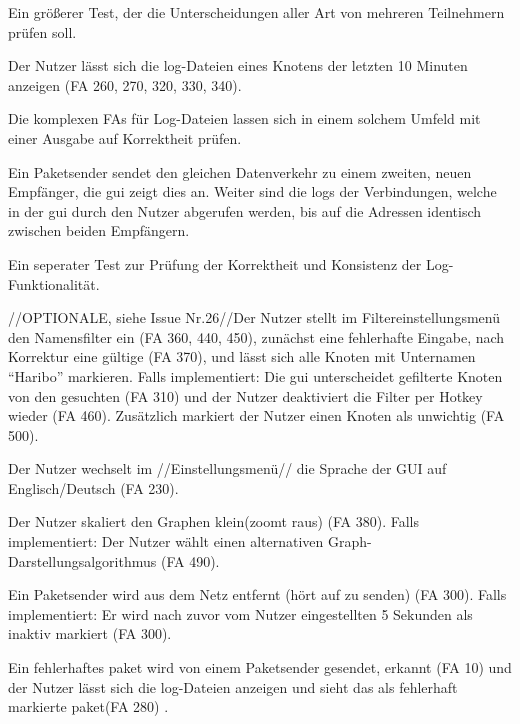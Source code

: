 \begin{description}[style=multiline, leftmargin=4cm, labelwidth=4cm]
  \item[Beschreibung] Ein größerer Test, der die Unterscheidungen aller Art von mehreren Teilnehmern prüfen soll.
  \item[\namedlabel{logs}{Log-Dateien anzeigen}] Der Nutzer lässt sich die \gls{log}-Dateien eines Knotens der letzten 10 Minuten anzeigen (FA 260, 270, 320, 330, 340).
  \item[Beschreibung] Die komplexen FAs für Log-Dateien lassen sich in einem solchem Umfeld mit einer Ausgabe auf Korrektheit prüfen.
  \item[\namedlabel{guiDisplay}{Korrekte GUI Darstellung}] Ein Paketsender sendet den gleichen Datenverkehr zu einem zweiten, neuen Empfänger, die \gls{gui} zeigt dies an. Weiter sind die \glspl{log} der Verbindungen, welche in der \gls{gui} durch den Nutzer abgerufen werden, bis auf die Adressen identisch zwischen beiden Empfängern.
  \item[Beschreibung] Ein seperater Test zur Prüfung der Korrektheit und Konsistenz der Log-Funktionalität.
  \item[\namedlabel{filter}{Filter anwenden}] //OPTIONALE, siehe Issue Nr.26//Der Nutzer stellt im Filtereinstellungsmenü den Namensfilter ein (FA 360, 440, 450), zunächst eine fehlerhafte Eingabe, nach Korrektur eine gültige (FA 370), und lässt sich alle Knoten mit Unternamen “Haribo” markieren. Falls implementiert: Die \gls{gui} unterscheidet gefilterte Knoten von den gesuchten (FA 310) und der Nutzer deaktiviert die Filter per Hotkey wieder (FA 460). Zusätzlich markiert der Nutzer einen Knoten als unwichtig (FA 500).
  \item[\namedlabel{changeLanguage}{Sprache ändern}] Der Nutzer wechselt im //Einstellungsmenü// die Sprache der GUI auf Englisch/Deutsch (FA 230).
  \item[\namedlabel{guiChanging}{Graph verändern}] Der Nutzer skaliert den Graphen klein(zoomt raus) (FA 380). Falls implementiert: Der Nutzer wählt einen alternativen Graph-Darstellungsalgorithmus (FA 490).
  \item[\namedlabel{inactive}{Netzteilnehmer wird inaktiv}] Ein Paketsender wird aus dem Netz entfernt (hört auf zu senden) (FA 300). Falls implementiert: Er wird nach zuvor vom Nutzer eingestellten 5 Sekunden als inaktiv markiert (FA 300).
  \item[\namedlabel{errpak}{Fehlerhaftes Paket}] Ein fehlerhaftes \gls{paket} wird von einem Paketsender gesendet, erkannt (FA 10) und der Nutzer lässt sich die \gls{log}-Dateien anzeigen und sieht das als fehlerhaft markierte \gls{paket}(FA 280) .

\end{description}

